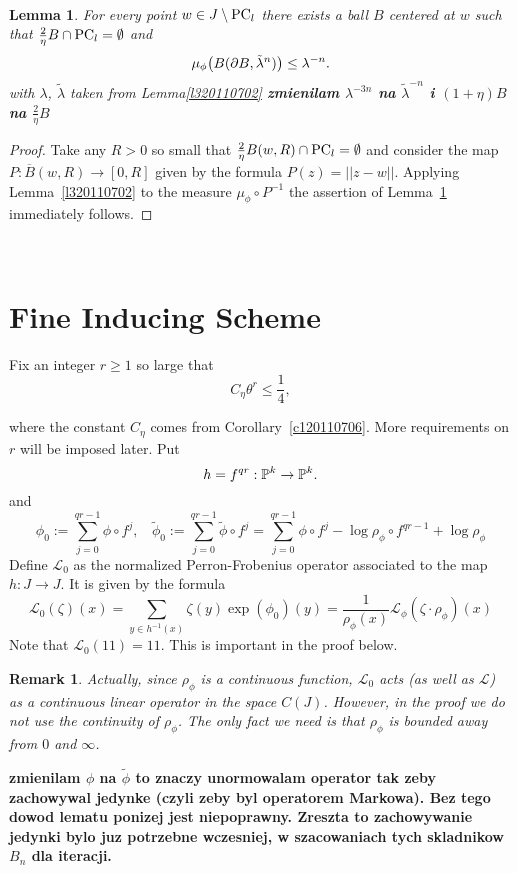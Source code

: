 \documentclass[12pt]{amsart}
\numberwithin{equation}{section}
\newcommand{\beq}{\begin{equation}}
\newcommand{\eeq}{\end{equation}}
\newcommand{\blem}{\begin{lem}}
\newcommand{\elem}{\end{lem}}
\newcommand{\nl}{\newline}
\newtheorem{lem}[thm]{Lemma}
\newtheorem{rem}[thm]{Remark}
\def\1{1\!\!1}
\def\L{{\mathcal L}}           \def\M{\mathcal M}        \def\Pa{{\mathcal P}}
\def\({\bigl(}                \def\){\bigr)}
\def\es{\emptyset}            \def\sms{\setminus}
\def\sp{\medskip}             \def\fr{\noindent}        \def\nl{\newline}
\def\ov{\overline}            \def\un{\underline}
\begin{document}
\

\blem\label{l420110702}
For every point $w\in J\sms\PC_l$ there exists a ball $B$ centered at
$w$ such that
 $\frac{2}{\eta}B\cap\PC_l=\es$
and 
$$
\mu_\phi\(B(\bd B,\tilde\l^{n})\)\le\l^{-n}.
$$
with $\lambda$, $\tilde\lambda$ taken from Lemma\ref{l320110702}
{\bf zmienilam $\lambda^{-3n}$ na $\tilde\lambda^{-n}$ i  $(1+\eta)B$ na $\frac{2}{\eta}B$ }

\elem

\begin{proof}
Take any $R>0$ so small that $\frac{2}{\eta}B(w,R)\cap\PC_l=\es$ and consider
the map $P:\ov B(w,R)\to[0,R]$ given by the formula
$P(z)=||z-w||$. Applying Lemma~\ref{l320110702} to the measure
$\mu_\phi\circ P^{-1}$ the assertion of Lemma~\ref{l420110702} immediately
follows. 
\end{proof}

\

\section{Fine Inducing Scheme}\label{fis}

Fix an
integer $r\ge 1$ so large that
\beq\label{120110706}
C_\eta\theta^r\le \frac{1}{4},
\eeq

where the constant $C_\eta$ comes from Corollary~\ref{c120110706}. More
requirements on $r$ will be imposed later. Put 
$$
h=f^{qr}:{\mathbb P}^k\to{\mathbb P}^k.
$$
and
$$
\phi_0:=\sum_{j=0}^{qr-1}\phi\circ f^j,~~~~\tilde \phi_0:=\sum_{j=0}^{qr-1}\tilde\phi\circ f^j=\sum_{j=0}^{qr-1}\phi\circ f^j-\log\rho_\phi\circ f^{qr-1}+\log\rho_\phi
$$
Define  $\L_0$ as the normalized  Perron-Frobenius operator associated to the map
$h:J\to J$.  It is given by the formula
$$
\L_0(\zeta)(x)=\sum_{y\in h^{-1}(x)}\zeta(y)\exp(\phi_0)(y)=\frac{1}{\rho_\phi(x)} \L_\phi\left (\zeta\cdot \rho_\phi\right )(x) 
$$
Note that $\mathcal{L}_{0}(\1)=\1$. This is important in the proof below.
\begin{rem}
Actually, since $\rho_\phi$ is a continuous function, $\L_0$ acts (as well as $\L$) as a continuous linear operator in the space $C(J)$. 
However, in the proof we do not use the continuity of $\rho_\phi$. The only fact we need is that $\rho_\phi$ is bounded away from $0$  and $\infty$.
\end{rem}
{\bf zmienilam $\phi$ na $\tilde\phi$ to znaczy unormowalam operator  tak zeby zachowywal jedynke (czyli zeby byl operatorem Markowa). Bez tego dowod lematu ponizej jest niepoprawny. Zreszta to zachowywanie jedynki bylo juz potrzebne wczesniej, w szacowaniach tych skladnikow $B_n$ dla iteracji.}
\end{document}
